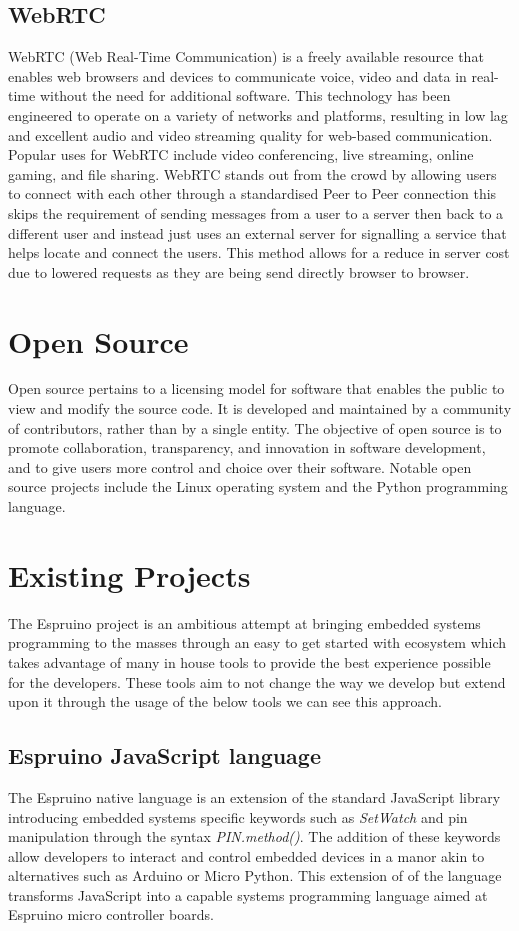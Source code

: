 \documentclass{l4proj}
\begin{document}
\subsection{WebRTC}
\text WebRTC (Web Real-Time Communication) is a freely available resource that enables web browsers and devices to communicate voice, video and data in real-time without the need for additional software. This technology has been engineered to operate on a variety of networks and platforms, resulting in low lag and excellent audio and video streaming quality for web-based communication. Popular uses for WebRTC include video conferencing, live streaming, online gaming, and file sharing. WebRTC stands out from the crowd by allowing users to connect with each other through a standardised Peer to Peer connection this skips the requirement of sending messages from a user to a server then back to a different user and instead just uses an external server for signalling a service that helps locate and connect the users. This method allows for a reduce in server cost due to lowered requests as they are being send directly browser to browser.

\section{Open Source}
\text Open source pertains to a licensing model for software that enables the public to view and modify the source code. It is developed and maintained by a community of contributors, rather than by a single entity. The objective of open source is to promote collaboration, transparency, and innovation in software development, and to give users more control and choice over their software. Notable open source projects include the Linux operating system and the Python programming language.

\section{Existing Projects}
\text The Espruino project is an ambitious attempt at bringing embedded systems programming to the masses through an easy to get started with ecosystem which takes advantage of many in house tools to provide the best experience possible for the developers. These tools aim to not change the way we develop but extend upon it through the usage of the below tools we can see this approach.

\subsection{Espruino JavaScript language}
The Espruino native language is an extension of the standard JavaScript library introducing embedded systems specific keywords such as \textit{SetWatch} and pin manipulation through the syntax \textit{PIN.method()}. The addition of these keywords allow developers to interact and control embedded devices in a manor akin to alternatives such as Arduino or Micro Python. This extension of of the language transforms JavaScript into a capable systems programming language aimed at Espruino micro controller boards.
\end{document}
